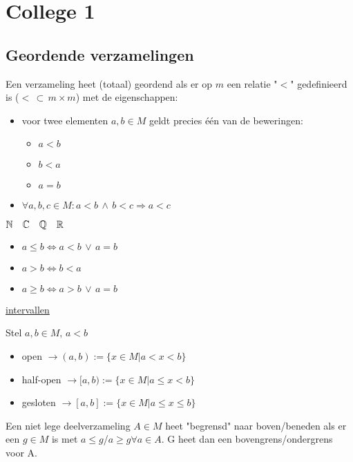 \documentclass[week=1]{homework}
\begin{document}
	\maketitle
	\newpage
	
	\section*{College 1}
	\subsection*{Geordende verzamelingen}
	 Een verzameling heet (totaal) geordend als er op $m$ een relatie "$<$" gedefinieerd is ($< \, \subset \, m \times m$) met de eigenschappen:
	\begin{itemize}
		\item voor twee elementen $a,b \in M$ geldt precies één van de beweringen: 
		\begin{itemize}
			\item $a<b$
			\item $b<a$
			\item $a=b$
		\end{itemize}
		\item $\forall a,b,c\in M: a<b \, \wedge \, b<c \Rightarrow a<c$ 
	\end{itemize}
	\Vb $\mathbb{N} \quad \mathbb{C} \quad \mathbb{Q} \quad \mathbb{R}$
	
	\Not \begin{itemize}
		\item $a\le b \Leftrightarrow a < b \, \vee \, a=b$ 
		\item $a>b \Leftrightarrow b<a$
		\item $a\ge b \Leftrightarrow a > b \, \vee \, a=b$ 
	\end{itemize}
	
	\Not \ul{intervallen}  
	
	Stel $a,b \in M, \, a<b$
	\begin{itemize}
		\item open $\rightarrow (a,b):= \{x\in M | a < x < b \} $
		\item half-open $\rightarrow [a,b):= \{x\in M | a \le x < b \}$
		\item gesloten $\rightarrow [a,b]:= \{x\in M|a \le x \le b\}$
	\end{itemize}
	
	\Def[Begrensd] Een niet lege deelverzameling $A \in M$ heet "begrensd" naar boven/beneden als er een $g \in M$ is met $a \le g$/$a \ge g \forall a \in A$. G heet dan een bovengrens/ondergrens voor A. 
	
\end{document}
